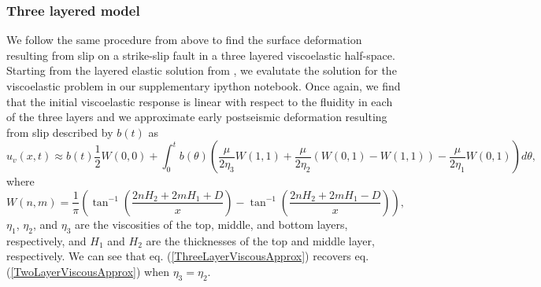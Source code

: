 \documentclass[extra]{gji}
\begin{document}
\subsubsection{Three layered model}
We follow the same procedure from above to find the surface
deformation resulting from slip on a strike-slip fault in a three
layered viscoelastic half-space.  Starting from the layered elastic
solution from \citet{CJ1972}, we evalutate the solution for the
viscoelastic problem in our supplementary ipython notebook. Once
again, we find that the initial viscoelastic response is linear with
respect to the fluidity in each of the three layers and we approximate
early postseismic deformation resulting from slip described by $b(t)$
as
\begin{equation}\label{ThreeLayerViscousApprox}
u_v(x,t) \approx b(t)\frac{1}{2} W(0,0) + 
         \int_0^tb(\theta)\left(\frac{\mu}{2\eta_3}W(1,1)
                               +\frac{\mu}{2\eta_2}(W(0,1) - W(1,1))
                               -\frac{\mu}{2\eta_1}W(0,1)\right)d\theta,
\end{equation}
where
\begin{equation}
  W(n,m) = \frac{1}{\pi}\left(\tan^{-1}\left(\frac{2nH_2 + 2mH_1 + D}{x}\right) - 
                              \tan^{-1}\left(\frac{2nH_2 + 2mH_1 - D}{x}\right)\right),
\end{equation}
$\eta_1$, $\eta_2$, and $\eta_3$ are the viscosities of the top,
middle, and bottom layers, respectively, and $H_1$ and $H_2$ are the
thicknesses of the top and middle layer, respectively.  We can see
that eq. (\ref{ThreeLayerViscousApprox}) recovers eq.
(\ref{TwoLayerViscousApprox}) when $\eta_3 = \eta_2$.
\end{document}

